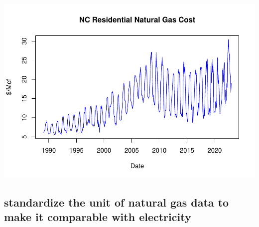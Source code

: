 \documentclass[
]{article}
\newenvironment{Shaded}{\begin{snugshade}}{\end{snugshade}}
\newcommand{\AttributeTok}[1]{\textcolor[rgb]{0.77,0.63,0.00}{#1}}
\newcommand{\CommentTok}[1]{\textcolor[rgb]{0.56,0.35,0.01}{\textit{#1}}}
\newcommand{\DecValTok}[1]{\textcolor[rgb]{0.00,0.00,0.81}{#1}}
\newcommand{\FunctionTok}[1]{\textcolor[rgb]{0.00,0.00,0.00}{#1}}
\newcommand{\NormalTok}[1]{#1}
\newcommand{\OtherTok}[1]{\textcolor[rgb]{0.56,0.35,0.01}{#1}}
\newcommand{\StringTok}[1]{\textcolor[rgb]{0.31,0.60,0.02}{#1}}
\begin{document}
\begin{Shaded}
\end{Shaded}

\includegraphics{Final-Project_files/figure-latex/unnamed-chunk-2-1.pdf}

\hypertarget{standardize-the-unit-of-natural-gas-data-to-make-it-comparable-with-electricity}{%
\subsection{standardize the unit of natural gas data to make it
comparable with
electricity}\label{standardize-the-unit-of-natural-gas-data-to-make-it-comparable-with-electricity}}
\end{document}
